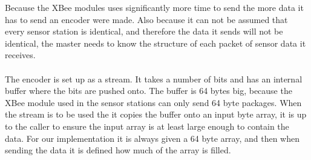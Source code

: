 Because the XBee modules uses significantly more time to send the more data it has to send an encoder were made. Also because it can not be assumed that every sensor station is identical, and therefore the data it sends will not be identical, the master needs to know the structure of each packet of sensor data it receives.
\\\\
The encoder is set up as a stream. It takes a number of bits and has an internal buffer where the bits are pushed onto. The buffer is 64 bytes big, because the XBee module used in the sensor stations can only send 64 byte packages. When the stream is to be used the it copies the buffer onto an input byte array, it is up to the caller to ensure the input array is at least large enough to contain the data. For our implementation it is always given a 64 byte array, and then when sending the data it is defined how much of the array is filled. 